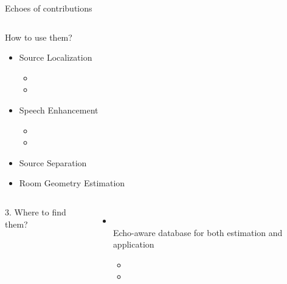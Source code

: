 \begin{frame}[t]{Echoes of contributions}
\begin{columns}[T,onlytextwidth]
        \begin{column}{0.48\textwidth}
            \begin{center}
                \alert{How to use them?}
            \end{center}
            \begin{itemize}
                \item Source Localization{\footnotesize
                \begin{itemize}
                    \item[\cmark] 
                    \item[\xmark] 
                \end{itemize}}
                \item Speech Enhancement{\footnotesize
                \begin{itemize}
                    \item[\cmark] 
                    \item[\xmark] 
                \end{itemize}}
                \item \textcolor{gray!70}{Source Separation {\footnotesize\faReply}}
                \item \textcolor{gray!70}{Room Geometry Estimation {\footnotesize\faReply}}
            \end{itemize}
        \end{column}
    \end{columns}


    \pause

    \begin{block}{}
        \begin{columns}
            \centering
            \alert{3. Where to find them?}
                \begin{itemize}
                    \item \dechorate
                    \\Echo-aware database for both estimation and application{\footnotesize
                    \begin{itemize}
                        \item[\cmark] 
                        \item[\cmark] 
                    \end{itemize}}
                \end{itemize}
        \end{columns}
    \end{block}

\end{frame}

